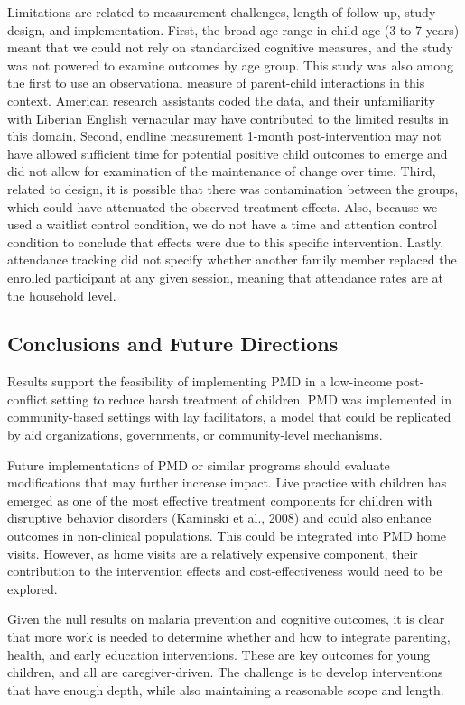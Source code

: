 \documentclass[12pt,authoryear]{elsarticle}\usepackage{knitr}
\begin{document}
Limitations are related to measurement challenges, length of follow-up, study design, and implementation. First, the broad age range in child age (3 to 7 years) meant that we could not rely on standardized cognitive measures, and the study was not powered to examine outcomes by age group. This study was also among the first to use an observational measure of parent-child interactions in this context. American research assistants coded the data, and their unfamiliarity with Liberian English vernacular may have contributed to the limited results in this domain. Second, endline measurement 1-month post-intervention may not have allowed sufficient time for potential positive child outcomes to emerge and did not allow for examination of the maintenance of change over time. Third, related to design, it is possible that there was contamination between the groups, which could have attenuated the observed treatment effects. Also, because we used a waitlist control condition, we do not have a time and attention control condition to conclude that effects were due to this specific intervention. Lastly, attendance tracking did not specify whether another family member replaced the enrolled participant at any given session, meaning that attendance rates are at the household level.

\subsection*{Conclusions and Future Directions}

Results support the feasibility of implementing PMD in a low-income post-conflict setting to reduce harsh treatment of children. PMD was implemented in community-based settings with lay facilitators, a model that could be replicated by aid organizations, governments, or community-level mechanisms. 

Future implementations of PMD or similar programs should evaluate modifications that may further increase impact. Live practice with children has emerged as one of the most effective treatment components for children with disruptive behavior disorders (Kaminski et al., 2008) and could also enhance outcomes in non-clinical populations. This could be integrated into PMD home visits. However, as home visits are a relatively expensive component, their contribution to the intervention effects and cost-effectiveness would need to be explored.

Given the null results on malaria prevention and cognitive outcomes, it is clear that more work is needed to determine whether and how to integrate parenting, health, and early education interventions. These are key outcomes for young children, and all are caregiver-driven. The challenge is to develop interventions that have enough depth, while also maintaining a reasonable scope and length.
\end{document}

